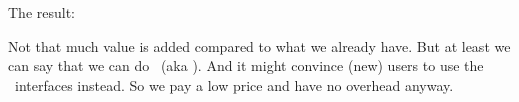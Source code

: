 \typebuffer \page The result: \getbuffer

\stoptitle

\starttitle[title=So what good is it]

\startitemize
\startitem Not that much value is added compared to what we already have. \stopitem
\startitem But at least we can say that we can do \ECMASCRIPT\ (aka \JAVASCRIPT). \stopitem
\startitem And it might convince (new) users to use the \LUA\ interfaces instead. \stopitem
\startitem So we pay a low price and have no overhead anyway. \stopitem
\stopitemize

\stoptitle

\stopdocument
